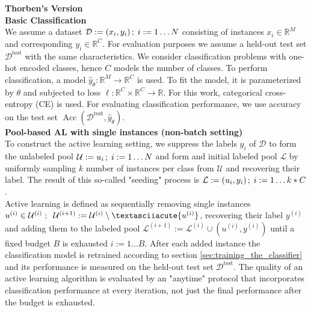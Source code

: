 \documentclass[]{article}
\begin{document}
\vspace{5mm}
\textbf{Thorben's Version}\\
\textbf{Basic Classification}\\
We assume a dataset $\mathcal{D} := (x_i, y_i) \hspace{0.5mm}; \hspace{1mm} i := 1 \ldots N$ consisting of instances $x_i \in \mathbb{R}^M$ and corresponding $y_i \in \mathbb{R}^C$.
For evaluation purposes we assume a held-out test set $\mathcal{D}^{\text{test}}$ with the same characteristics.
We consider classification problems with one-hot encoded classes, hence $C$ models the number of classes.
To perform classification, a model $\hat y_\theta : \mathbb{R}^M \rightarrow \mathbb{R}^C$ is used. To fit the model, it is parameterized by $\theta$ and subjected to loss $\ell: \mathbb{R}^C \times \mathbb{R}^C \rightarrow \mathbb{R}$. For this work, categorical cross-entropy (CE) is used.
For evaluating classification performance, we use accuracy on the test set $\operatorname{Acc}(\mathcal{D}^{\text{test}}, \hat{y}_\theta)$. \\ [1mm]
%
\textbf{Pool-based AL with single instances (non-batch setting)}\\
To construct the active learning setting, we suppress the labels $y_i$ of $\mathcal{D}$ to form the unlabeled pool $\mathcal{U} := u_i \hspace{0.5mm}; \hspace{1mm} i := 1 \ldots N$ and form and initial labeled pool $\mathcal{L}$ by uniformly sampling $k$ number of instances per class from $\mathcal{U}$ and recovering their label. 
The result of this so-called "seeding" process is $\mathcal{L} := (u_i, y_i) \hspace{0.5mm}; \hspace{1mm} i := 1 \ldots k*C$. \\
Active learning is defined as sequentially removing single instances $u^{(i)} \in \mathcal{U}^{(i)}\hspace{1mm}; \hspace{2mm} \mathcal{U}^{(i+1)} := \mathcal{U}^{(i)} \setminus´ \{u^{(i)}\}$, recovering their label $y^{(i)}$ and adding them to the labeled pool $\mathcal{L}^{(i+1)} := \mathcal{L}^{(i)} \cup (u^{(i)}, y^{(i)})$ until a fixed budget $B$ is exhausted $i := 1 \ldots B$.
After each added instance the classification model is retrained according to section \ref{sec:training_the_classifier} and its performance is measured on the held-out test set $\mathcal{D}^{\text{test}}$.
The quality of an active learning algorithm is evaluated by an "anytime" protocol that incorporates classification performance at every iteration, not just the final performance after the budget is exhausted.
\end{document}
